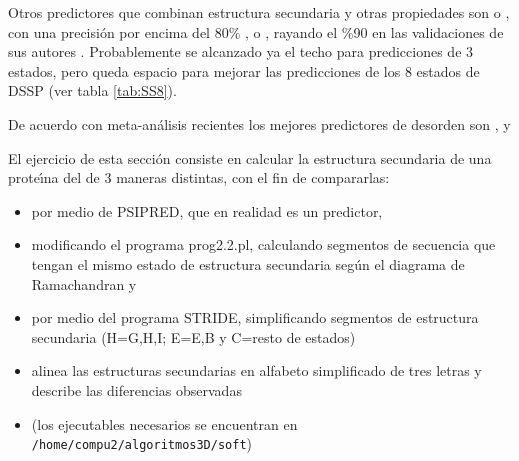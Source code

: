 Otros predictores que combinan estructura secundaria y otras propiedades son 
 o 
, con una precisi\'{o}n por encima del 80\% \citep{Sormanni2014,Heffernan2015},
o , rayando el \%90 en las validaciones de sus autores \citep{Magnan2014}.
Probablemente se alcanzado ya el techo para predicciones de 3 estados, pero queda espacio para mejorar las predicciones 
de los 8 estados de DSSP \citep{Yang2018} (ver tabla \ref{tab:SS8}).

De acuerdo con meta-an\'{a}lisis recientes los mejores predictores de desorden son
,
 y
\citep{Wang2016,Meng2017}

El ejercicio de esta secci\'{o}n consiste en calcular la estructura secundaria de una prote\'\i{}na del 
 de 3 maneras distintas, con el fin de compararlas:
\begin{itemize}
\item por medio de PSIPRED, que en realidad es un predictor,
\item modificando el programa prog2.2.pl, calculando segmentos de secuencia que tengan el mismo estado de estructura secundaria
seg\'{u}n el diagrama de Ramachandran y 
\item por medio del programa STRIDE, simplificando segmentos de estructura secundaria (H=G,H,I; E=E,B y C=resto de estados)
\item alinea las estructuras secundarias en alfabeto simplificado de tres letras y describe las diferencias observadas
\item (los ejecutables necesarios se encuentran en \verb+/home/compu2/algoritmos3D/soft+)
\end{itemize}
